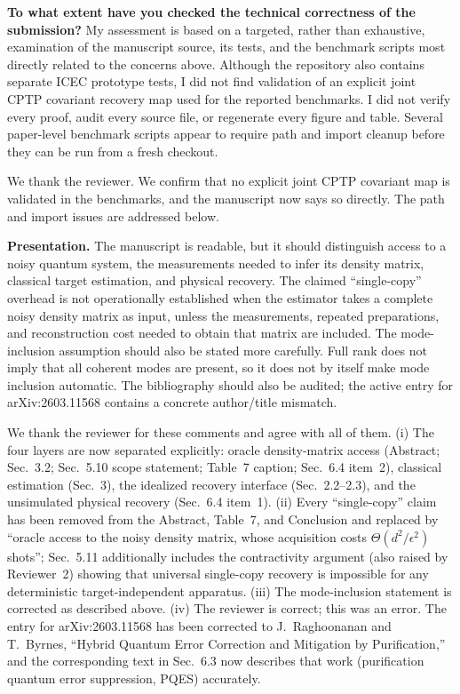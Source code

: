 \documentclass[11pt,a4paper]{article}
\newcommand{\rev}[1]{{\color{black}#1}}
\newcommand{\resp}[1]{{\color{red}#1}}
\begin{document}
\rev{\textbf{To what extent have you checked the technical correctness of the submission?} My assessment is based on a targeted, rather than exhaustive, examination of the manuscript source, its tests, and the benchmark scripts most directly related to the concerns above. Although the repository also contains separate ICEC prototype tests, I did not find validation of an explicit joint CPTP covariant recovery map used for the reported benchmarks. I did not verify every proof, audit every source file, or regenerate every figure and table. Several paper-level benchmark scripts appear to require path and import cleanup before they can be run from a fresh checkout.}

\resp{We thank the reviewer. We confirm that no explicit joint CPTP covariant map is validated in the benchmarks, and the manuscript now says so directly. The path and import issues are addressed below.}

\rev{\textbf{Presentation.} The manuscript is readable, but it should distinguish access to a noisy quantum system, the measurements needed to infer its density matrix, classical target estimation, and physical recovery. The claimed ``single-copy'' overhead is not operationally established when the estimator takes a complete noisy density matrix as input, unless the measurements, repeated preparations, and reconstruction cost needed to obtain that matrix are included. The mode-inclusion assumption should also be stated more carefully. Full rank does not imply that all coherent modes are present, so it does not by itself make mode inclusion automatic. The bibliography should also be audited; the active entry for arXiv:2603.11568 contains a concrete author/title mismatch.}

\resp{We thank the reviewer for these comments and agree with all of them. (i) The four layers are now separated explicitly: oracle density-matrix access (Abstract; Sec.~3.2; Sec.~5.10 scope statement; Table~7 caption; Sec.~6.4 item~2), classical estimation (Sec.~3), the idealized recovery interface (Sec.~2.2--2.3), and the unsimulated physical recovery (Sec.~6.4 item~1). (ii) Every ``single-copy'' claim has been removed from the Abstract, Table~7, and Conclusion and replaced by ``oracle access to the noisy density matrix, whose acquisition costs $\Theta(d^2/\epsilon^2)$ shots''; Sec.~5.11 additionally includes the contractivity argument (also raised by Reviewer~2) showing that universal single-copy recovery is impossible for any deterministic target-independent apparatus. (iii) The mode-inclusion statement is corrected as described above. (iv) The reviewer is correct; this was an error. The entry for arXiv:2603.11568 has been corrected to J.~Raghoonanan and T.~Byrnes, ``Hybrid Quantum Error Correction and Mitigation by Purification,'' and the corresponding text in Sec.~6.3 now describes that work (purification quantum error suppression, PQES) accurately.}
\end{document}
